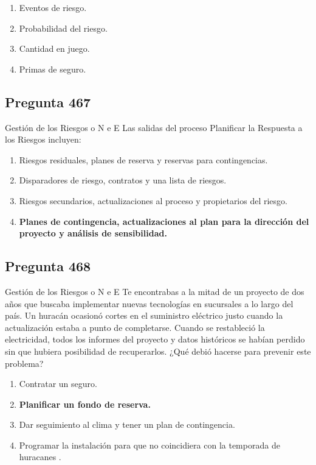 \documentclass[11pt,a4paper]{article}
\begin{document}
\begin{enumerate}[label=\alph*)]
  \item Eventos de riesgo.
  \item Probabilidad del riesgo.
  \item Cantidad en juego.
  \item Primas de seguro.
\end{enumerate}

\subsection*{Pregunta 467}
Gestión de los Riesgos o N e E Las salidas del proceso Planificar la Respuesta a los Riesgos incluyen:

\begin{enumerate}[label=\alph*)]
  \item Riesgos residuales, planes de reserva y reservas para contingencias.
  \item Disparadores de riesgo, contratos y una lista de riesgos.
  \item Riesgos secundarios, actualizaciones al proceso y propietarios del riesgo.
  \item \textbf{Planes de contingencia, actualizaciones al plan para la dirección del proyecto y análisis de sensibilidad.}
\end{enumerate}

\subsection*{Pregunta 468}
Gestión de los Riesgos o N e E Te encontrabas a la mitad de un proyecto de dos años que buscaba implementar nuevas tecnologías en sucursales a lo largo del país. Un huracán ocasionó cortes en el suministro eléctrico justo cuando la actualización estaba a punto de completarse. Cuando se restableció la electricidad, todos los informes del proyecto y datos históricos se habían perdido sin que hubiera posibilidad de recuperarlos. ¿Qué debió hacerse para prevenir este problema?

\begin{enumerate}[label=\alph*)]
  \item Contratar un seguro.
  \item \textbf{Planificar un fondo de reserva.}
  \item Dar seguimiento al clima y tener un plan de contingencia.
  \item Programar la instalación para que no coincidiera con la temporada de huracanes .
\end{enumerate}
\end{document}
